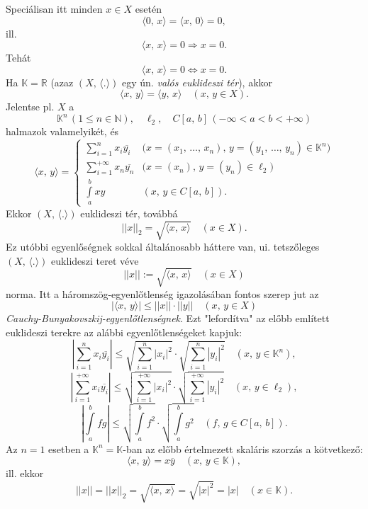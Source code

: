 \documentclass[12pt]{article}
\newcommand{\R}{\mathbb{R}}
\newcommand{\N}{\mathbb{N}}
\newcommand{\K}{\mathbb{K}}
\begin{document}
    Speciálisan itt minden $x \in X$ esetén
    \[
        \langle 0, \, x \rangle = \langle x, \, 0 \rangle = 0,
    \]
    ill.
    \[
        \langle x, \, x \rangle = 0 \Longrightarrow x = 0.
    \]
    Tehát 
    \[
        \langle x, \, x \rangle = 0 \Longleftrightarrow x = 0.
    \]
    Ha $\K = \R$ (azaz $(X, \, \langle . \rangle)$ egy ún. \textit{valós euklideszi tér}), akkor 
    \[
        \langle x, \, y \rangle = \langle y, \, x \rangle \quad (x, \, y \in X).
    \]
    Jelentse pl. $X$ a
    \[
        \K^n \, (1 \leq n \in \N), \quad \ell_2, \quad C[a,\, b] \, (- \infty < a < b < + \infty)
    \]
    halmazok valamelyikét, és
    \[
        \langle x, \, y \rangle =
        \begin{cases}
            \displaystyle \sum_{i=1}^n x_i \overline{y_i} & \big( x=(x_1, \, \dots, \, x_n), \, y = (y_1, \, \dots, \, y_n) \in \K^n \big) \\
            \displaystyle \sum_{i=1}^{+\infty} x_n \overline{y_n} & \big( x=(x_n), \, y=(y_n) \in \ell_2 \big) \\
            \displaystyle \int\limits_a^b xy & (x, \, y \in C[a, \, b]).
        \end{cases}
    \]
    Ekkor $(X, \, \langle . \rangle)$ euklideszi tér, továbbá
    \[
        ||x||_2 = \sqrt{\langle x, \, x \rangle} \quad (x \in X).
    \]
    Ez utóbbi egyenlőségnek sokkal általánosabb háttere van, ui. tetszőleges $(X, \, \langle . \rangle)$ euklideszi teret véve
    \[
        ||x|| := \sqrt{\langle x, \, x \rangle} \quad (x \in X)
    \]
    norma. Itt a háromszög-egyenlőtlenség igazolásában fontos szerep jut az
    \[
        |\langle x, \, y \rangle| \leq ||x|| \cdot ||y|| \quad (x, \, y \in X)
    \]
    \textit{Cauchy-Bunyakovszkij-egyenlőtlenségnek}. Ezt "lefordítva" az előbb említett euklideszi terekre az alábbi egyenlőtlenségeket kapjuk:
    \[
        \left| \sum_{i=1}^n x_i \overline{y_i} \right| \leq \sqrt{\sum_{i=1}^n |x_i|^2} \cdot \sqrt{\sum_{i=1}^n |y_i|^2} \quad (x, \, y \in \K^n),
    \]
    \[
        \left| \sum_{i=1}^{+\infty} x_i \overline{y_i} \right| \leq \sqrt{\sum_{i=1}^{+\infty} |x_i|^2} \cdot \sqrt{\sum_{i=1}^{+\infty} |y_i|^2} \quad (x, \, y \in \ell_2),
    \]
    \[
        \left| \int\limits_a^b fg \right| \leq \sqrt{\int\limits_a^b f^2} \cdot \sqrt{\int\limits_a^b g^2} \quad (f, \, g \in C[a, \, b]).
    \]
    Az $n = 1$ esetben a $\K^n = \K$-ban az előbb értelmezett skaláris szorzás a kötvetkező:
    \[
         \langle x, \, y \rangle = x \overline{y} \quad (x, \, y \in \K),
    \]
    ill. ekkor
    \[
        ||x|| = ||x||_2 = \sqrt{\langle x, \, x \rangle} = \sqrt{|x|^2} = |x| \quad (x \in \K).
    \]
\end{document}
